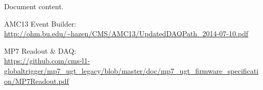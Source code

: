 \documentclass[11pt,a4paper,english,titlepage]{article}
\begin{document}
    \doctitlepage{}

    \doctoc{}

    Document content.
    

    \doctables{}

    \docfigures{}

    \clearpage

    \begin{thebibliography}{00}

    AMC13 Event Builder:\\
    \url{http://ohm.bu.edu/~hazen/CMS/AMC13/UpdatedDAQPath_2014-07-10.pdf}

    MP7 Readout \& DAQ:\\
    \url{https://github.com/cms-l1-globaltrigger/mp7_ugt_legacy/blob/master/doc/mp7_ugt_firmware_specification/MP7Readout.pdf}

    \end{thebibliography}

\end{document}
